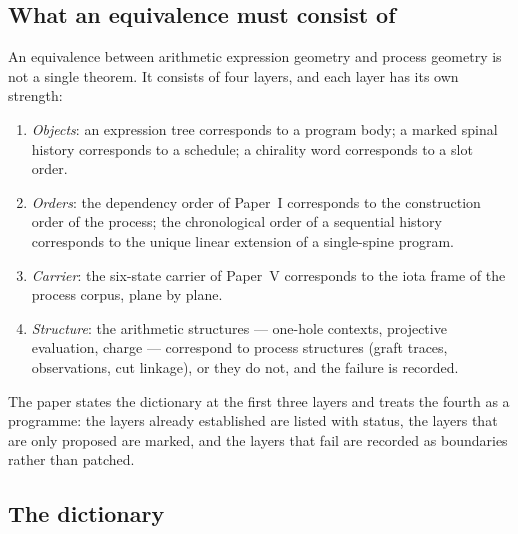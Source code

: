 
\subsection{What an equivalence must consist of}

An equivalence between arithmetic expression geometry and process geometry is not a
single theorem.  It consists of four layers, and each layer has its own strength:

\begin{enumerate}
\item \emph{Objects}: an expression tree corresponds to a program body; a marked
  spinal history corresponds to a schedule; a chirality word corresponds to a slot
  order.
\item \emph{Orders}: the dependency order of Paper~I corresponds to the construction
  order of the process; the chronological order of a sequential history corresponds
  to the unique linear extension of a single-spine program.
\item \emph{Carrier}: the six-state carrier of Paper~V corresponds to the iota frame
  of the process corpus, plane by plane.
\item \emph{Structure}: the arithmetic structures --- one-hole contexts, projective
  evaluation, charge --- correspond to process structures (graft traces, observations,
  cut linkage), or they do not, and the failure is recorded.
\end{enumerate}

The paper states the dictionary at the first three layers and treats the fourth as a
programme: the layers already established are listed with status, the layers that are
only proposed are marked, and the layers that fail are recorded as boundaries rather
than patched.

\subsection{The dictionary}

